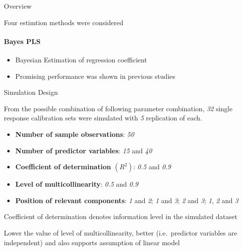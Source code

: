 \documentclass[ignorenonframetext,]{beamer}
\providecommand{\tightlist}{%
\setlength{\itemsep}{0pt}\setlength{\parskip}{0pt}}
\begin{document}
\begin{frame}{Overview}
\begin{block}{Four estimtion methods were considered}
\paragraph{Bayes PLS}\label{bayes-pls}

\begin{itemize}
\tightlist
\item
  Bayesian Estimation of regression coefficient
\item
  Promising performance was shown in previous studies
  \citep{helland2012near}
\end{itemize}

\end{block}

\end{frame}

\begin{frame}{Simulation Design}

\pause

From the possible combination of following parameter combination,
\emph{32} single response calibration sets were simulated with \emph{5}
replication of each.

\begin{itemize}[<+->]
\tightlist
\item
  \textbf{Number of sample observations}: \emph{50}
\item
  \textbf{Number of predictor variables}: \emph{15} and \emph{40}
\item
  \textbf{Coefficient of determination \((R^2)\)}: \emph{0.5} and
  \emph{0.9}
\item
  \textbf{Level of multicollinearity}: \emph{0.5} and \emph{0.9}
\item
  \textbf{Position of relevant components}: \emph{1} and \emph{2};
  \emph{1} and \emph{3}; \emph{2} and \emph{3}; \emph{1}, \emph{2} and
  \emph{3}
\end{itemize}

\begin{block}{Coefficient of determination denotes information level in
the simulated dataset}

\end{block}

\begin{block}{Lower the value of level of multicollinearity, better
(i.e.~predictor variables are independent) and also supports assumption
of linear model}

\end{block}

\end{frame}
\end{document}
